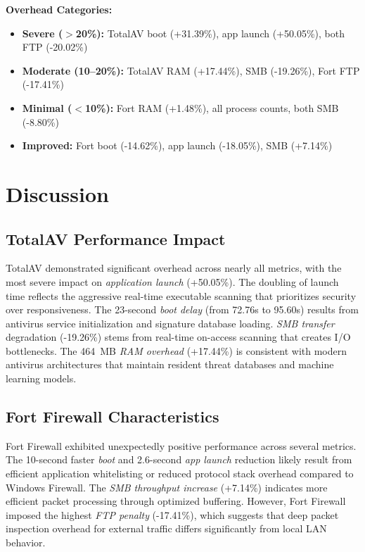 \documentclass[runningheads,a4paper,english]{llncs}[2022/01/12]
\begin{document}
\textbf{Overhead Categories:}
\begin{itemize}
\item \textbf{Severe ($>$20\%):} TotalAV boot (+31.39\%), app launch (+50.05\%), both FTP (-20.02\%)
\item \textbf{Moderate (10--20\%):} TotalAV RAM (+17.44\%), SMB (-19.26\%), Fort FTP (-17.41\%)
\item \textbf{Minimal ($<$10\%):} Fort RAM (+1.48\%), all process counts, both SMB (-8.80\%)
\item \textbf{Improved:} Fort boot (-14.62\%), app launch (-18.05\%), SMB (+7.14\%)
\end{itemize}

\section{Discussion}
\label{sec:discussion}

\subsection{TotalAV Performance Impact}

TotalAV demonstrated significant overhead across nearly all metrics, with the most severe impact on \textit{application launch} (+50.05\%). The doubling of launch time reflects the aggressive real-time executable scanning that prioritizes security over responsiveness. The 23-second \textit{boot delay} (from 72.76s to 95.60s) results from antivirus service initialization and signature database loading. \textit{SMB transfer} degradation (-19.26\%) stems from real-time on-access scanning that creates I/O bottlenecks. The 464~MB \textit{RAM overhead} (+17.44\%) is consistent with modern antivirus architectures that maintain resident threat databases and machine learning models.

\subsection{Fort Firewall Characteristics}

Fort Firewall exhibited unexpectedly positive performance across several metrics. The 10-second faster \textit{boot} and 2.6-second \textit{app launch} reduction likely result from efficient application whitelisting or reduced protocol stack overhead compared to Windows Firewall. The \textit{SMB throughput increase} (+7.14\%) indicates more efficient packet processing through optimized buffering. However, Fort Firewall imposed the highest \textit{FTP penalty} (-17.41\%), which suggests that deep packet inspection overhead for external traffic differs significantly from local LAN behavior.
\end{document}
